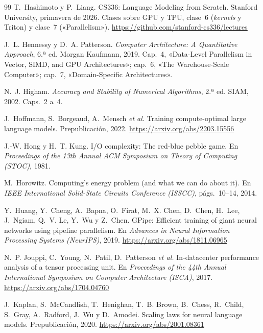 \begin{thebibliography}{99}
T.~Hashimoto y P.~Liang.
\newblock CS336: Language Modeling from Scratch.
\newblock Stanford University, primavera de 2026. Clases sobre GPU y TPU, clase~6 (\emph{kernels} y Triton) y clase~7 («Parallelism»).
\newblock \url{https://github.com/stanford-cs336/lectures}

J.~L. Hennessy y D.~A. Patterson.
\newblock \emph{Computer Architecture: A Quantitative Approach}, 6.ª ed.
\newblock Morgan Kaufmann, 2019.
\newblock Cap.~4, «Data-Level Parallelism in Vector, SIMD, and GPU Architectures»; cap.~6, «The Warehouse-Scale Computer»; cap.~7, «Domain-Specific Architectures».

N.~J. Higham.
\newblock \emph{Accuracy and Stability of Numerical Algorithms}, 2.ª ed.
\newblock SIAM, 2002.
\newblock Caps.~2 a~4.

J.~Hoffmann, S.~Borgeaud, A.~Mensch \emph{et al.}
\newblock Training compute-optimal large language models.
\newblock Prepublicación, 2022.
\newblock \url{https://arxiv.org/abs/2203.15556}

J.-W. Hong y H.~T. Kung.
\newblock I/O complexity: The red-blue pebble game.
\newblock En \emph{Proceedings of the 13th Annual ACM Symposium on Theory of Computing (STOC)}, 1981.

M.~Horowitz.
\newblock Computing's energy problem (and what we can do about it).
\newblock En \emph{IEEE International Solid-State Circuits Conference (ISSCC)}, págs.~10--14, 2014.

Y.~Huang, Y.~Cheng, A.~Bapna, O.~Firat, M.~X. Chen, D.~Chen, H.~Lee, J.~Ngiam, Q.~V. Le, Y.~Wu y Z.~Chen.
\newblock GPipe: Efficient training of giant neural networks using pipeline parallelism.
\newblock En \emph{Advances in Neural Information Processing Systems (NeurIPS)}, 2019.
\newblock \url{https://arxiv.org/abs/1811.06965}

N.~P. Jouppi, C.~Young, N.~Patil, D.~Patterson \emph{et al.}
\newblock In-datacenter performance analysis of a tensor processing unit.
\newblock En \emph{Proceedings of the 44th Annual International Symposium on Computer Architecture (ISCA)}, 2017.
\newblock \url{https://arxiv.org/abs/1704.04760}

J.~Kaplan, S.~McCandlish, T.~Henighan, T.~B. Brown, B.~Chess, R.~Child, S.~Gray, A.~Radford, J.~Wu y D.~Amodei.
\newblock Scaling laws for neural language models.
\newblock Prepublicación, 2020.
\newblock \url{https://arxiv.org/abs/2001.08361}


\end{thebibliography}
